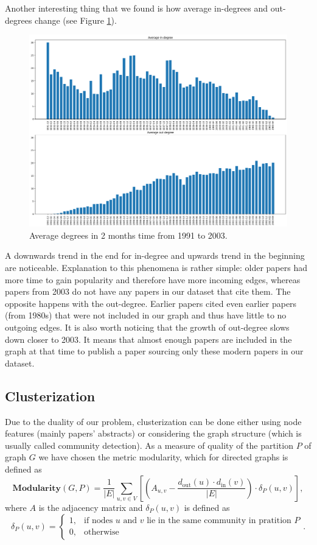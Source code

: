 Another interesting thing that we found is how average in-degrees and out-degrees change (see Figure \ref{plot:average_degree_per_month}).
\begin{figure}[h]
\centering
\includegraphics[width=1\linewidth]{degrees_over_time.png}
\caption{Average degrees in 2 months time from 1991 to 2003.} \label{plot:average_degree_per_month}
\end{figure}
A downwards trend in the end for in-degree and upwards trend in the beginning are noticeable. Explanation to this phenomena is rather simple: older papers had more time to gain popularity and therefore have more incoming edges, whereas papers from 2003 do not have any papers in our dataset that cite them. The opposite happens with the out-degree. Earlier papers cited even earlier papers (from 1980s) that were not included in our graph and thus have little to no outgoing edges. It is also worth noticing that the growth of out-degree slows down closer to 2003. It means that almost enough papers are included in the graph at that time to publish a paper sourcing only these modern papers in our dataset.

\subsection{Clusterization}
Due to the duality of our problem, clusterization can be done either using node features (mainly papers' abstracts) or considering the graph structure (which is usually called community detection). As a measure of quality of the partition $P$ of graph $G$ we have chosen the metric modularity, which for directed graphs is defined as
$$\textbf{Modularity}(G, P) = \frac{1}{|E|} \sum_{u, v \in V} \left[\left(A_{u, v} - \frac{d_{\text{out}}(u)\cdot d_{\text{in}}(v)}{|E|}\right)\cdot \delta_P(u, v)\right],$$
where $A$  is the adjacency matrix and $\delta_P(u, v)$ is defined as
$$\delta_P(u, v) =
\begin{cases}
1, & \text{if nodes } u \text{ and } v \text{ lie in the same community in pratition } P \\
0, & \text{otherwise}
\end{cases}.
$$ 

